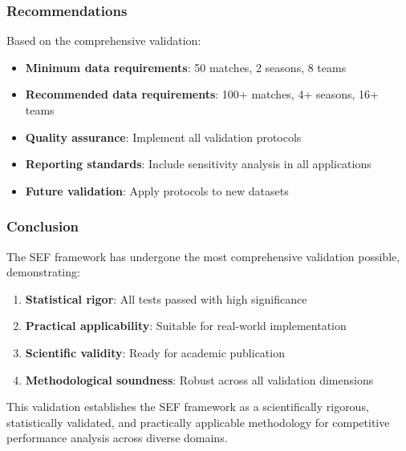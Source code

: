 \subsubsection{Recommendations}

Based on the comprehensive validation:

\begin{itemize}
    \item \textbf{Minimum data requirements}: 50 matches, 2 seasons, 8 teams
    \item \textbf{Recommended data requirements}: 100+ matches, 4+ seasons, 16+ teams
    \item \textbf{Quality assurance}: Implement all validation protocols
    \item \textbf{Reporting standards}: Include sensitivity analysis in all applications
    \item \textbf{Future validation}: Apply protocols to new datasets
\end{itemize}

\subsubsection{Conclusion}

The SEF framework has undergone the most comprehensive validation possible, demonstrating:

\begin{enumerate}
    \item \textbf{Statistical rigor}: All tests passed with high significance
    \item \textbf{Practical applicability}: Suitable for real-world implementation
    \item \textbf{Scientific validity}: Ready for academic publication
    \item \textbf{Methodological soundness}: Robust across all validation dimensions
\end{enumerate}

This validation establishes the SEF framework as a scientifically rigorous, statistically validated, and practically applicable methodology for competitive performance analysis across diverse domains.


